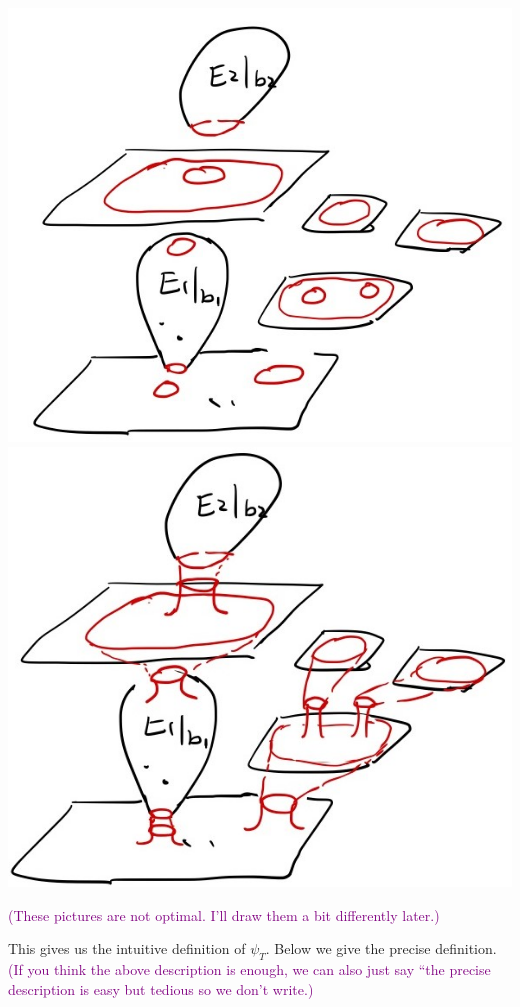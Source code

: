 \documentclass[11pt]{article}
\theoremstyle{definition}
\theoremstyle{remark}
\def\cmt#1{\textcolor{purple}{(#1)}}
\begin{document}
\includegraphics[scale=0.15]{xcut_fig}
\hspace{3cm}
\includegraphics[scale=0.15]{xglue_fig}

\cmt{These pictures are not optimal. I'll draw them a bit differently later.}

This gives us the intuitive definition of $\psi_T$. Below we give the precise definition. 
\cmt{If you think the above description is enough, we can also just say ``the precise description is easy but tedious so we don't write.}
\end{document}
